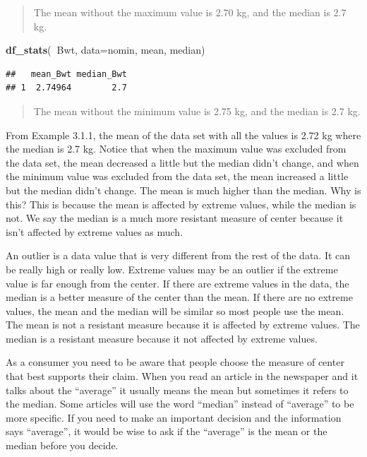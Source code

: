 \documentclass[]{book}
\newenvironment{Shaded}{\begin{snugshade}}{\end{snugshade}}
\newcommand{\DataTypeTok}[1]{\textcolor[rgb]{0.13,0.29,0.53}{#1}}
\newcommand{\KeywordTok}[1]{\textcolor[rgb]{0.13,0.29,0.53}{\textbf{#1}}}
\newcommand{\NormalTok}[1]{#1}
\newcommand{\OperatorTok}[1]{\textcolor[rgb]{0.81,0.36,0.00}{\textbf{#1}}}
\begin{document}
\begin{quote}
The mean without the maximum value is 2.70 kg, and the median is 2.7 kg.
\end{quote}

\begin{Shaded}
\begin{Highlighting}[]
\KeywordTok{df_stats}\NormalTok{(}\OperatorTok{~}\NormalTok{Bwt, }\DataTypeTok{data=}\NormalTok{nomin, mean, median)}
\end{Highlighting}
\end{Shaded}

\begin{verbatim}
##   mean_Bwt median_Bwt
## 1  2.74964        2.7
\end{verbatim}

\begin{quote}
The mean without the minimum value is 2.75 kg, and the median is 2.7 kg.
\end{quote}

From Example 3.1.1, the mean of the data set with all the values is 2.72 kg where the median is 2.7 kg. Notice that when the maximum value was excluded from the data set, the mean decreased a little but the median didn't change, and when the minimum value was excluded from the data set, the mean increased a little but the median didn't change. The mean is much higher than the median. Why is this? This is because the mean is affected by extreme values, while the median is not. We say the median is a much more resistant measure of center because it isn't affected by extreme values as much.

An outlier is a data value that is very different from the rest of the data. It can be really high or really low. Extreme values may be an outlier if the extreme value is far enough from the center. If there are extreme values in the data, the median is a better measure of the center than the mean. If there are no extreme values, the mean and the median will be similar so most people use the mean. The mean is not a resistant measure because it is affected by extreme values. The median is a resistant measure because it not affected by extreme values.

As a consumer you need to be aware that people choose the measure of center that best supports their claim. When you read an article in the newspaper and it talks about the ``average'' it usually means the mean but sometimes it refers to the median. Some articles will use the word ``median'' instead of ``average'' to be more specific. If you need to make an important decision and the information says ``average'', it would be wise to ask if the ``average'' is the mean or the median before you
decide.
\end{document}
